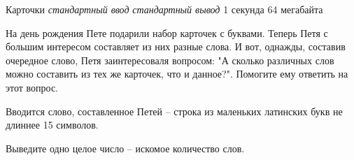 \begin{problem}%
{Карточки}%
{\textsl{стандартный ввод}}%
{\textsl{стандартный вывод}}%
{1 секунда}%
{64 мегабайта}{}

На день рождения Пете подарили набор карточек с буквами. Теперь Петя с большим интересом составляет из них разные слова. И вот, однажды, составив очередное слово, Петя заинтересоваля вопросом: "А сколько различных слов можно составить из тех же карточек, что и данное?". Помогите ему ответить на этот вопрос.

\InputFile

Вводится слово, составленное Петей – строка из маленьких латинских букв не длиннее 15 символов.

\OutputFile

Выведите одно целое число – искомое количество слов.

\Examples

\begin{example}
%
\end{example}
\end{problem}